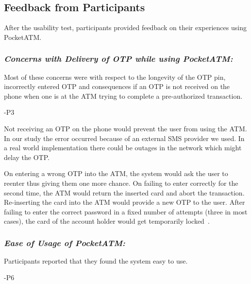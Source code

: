 \subsection{Feedback from Participants}
\label{ssec:feedback}

After the usability test, participants provided feedback on their experiences using PocketATM.

\subsubsection*{\textit{\textbf{Concerns with Delivery of OTP while using PocketATM:}}}
\label{sssec:otpdelivery}

Most of these concerns were with respect to the longevity of the OTP pin, incorrectly entered OTP and consequences if an OTP is not received on the phone when one is at the ATM trying to complete a pre-authorized transaction.

\textcolor{quotegray}{ -P3}

Not receiving an OTP on the phone would prevent the user from using the ATM. In our study the error occurred because of an external SMS provider we used. In a real world implementation there could be outages in the network which might delay the OTP. 

On entering a wrong OTP into the ATM, the system would ask the user to reenter thus giving them one more chance. On failing to enter correctly for the second time, the ATM would return the inserted card and abort the transaction. Re-inserting the card into the ATM would provide a new OTP to the user. After failing to enter the correct password in a fixed number of attempts (three in most cases), the card of the account holder would get temporarily locked~\cite{SBITOS}.

\subsubsection*{\textit{\textbf{Ease of Usage of PocketATM:}}}
\label{sssec:easeofusage}

Participants reported that they found the system easy to use.

\textcolor{quotegray}{ -P6}

